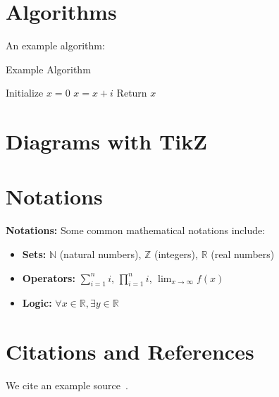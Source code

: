\documentclass[a4paper,12pt]{article}
\begin{document}
\section{Algorithms}
An example algorithm:
\begin{algorithm}
	\caption{Example Algorithm}
	\begin{algorithmic}
		\STATE{}Initialize \(x=0\)
		\STATE{}\(x = x + i\)
		\ENDFOR{}
		\STATE{}Return \(x\)
	\end{algorithmic}
\end{algorithm}

\section{Diagrams with TikZ}

\section{Notations}
\textbf{Notations:} Some common mathematical notations include:
\begin{itemize}
    \item \textbf{Sets:} \(\mathbb{N}\) (natural numbers), \(\mathbb{Z}\) (integers), \(\mathbb{R}\) (real numbers)
    \item \textbf{Operators:} \(\sum_{i=1}^{n} i\), \(\prod_{i=1}^{n} i\), \(\lim_{x \to \infty} f(x)\)
    \item \textbf{Logic:} \(\forall x \in \mathbb{R}, \exists y \in \mathbb{R}\)
\end{itemize}

\section{Citations and References}
We cite an example source~\cite{exampleSource}.

\printbibliography[]
\end{document}
